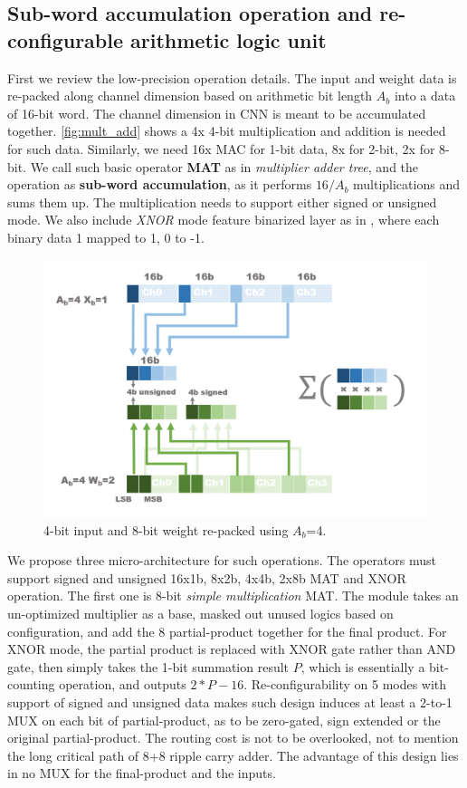 \subsection{Sub-word accumulation operation and re-configurable arithmetic logic unit}
First we review the low-precision operation details. The input and weight data is re-packed along channel dimension based on arithmetic bit length $A_b$ into a data of 16-bit word. The channel dimension in CNN is meant to be accumulated together. \autoref{fig:mult_add} shows a 4x 4-bit multiplication and addition is needed for such data. Similarly, we need 16x MAC for 1-bit data, 8x for 2-bit, 2x for 8-bit. We call such basic operator \textbf{MAT} as in \textit{multiplier adder tree}, and the operation as \textbf{sub-word accumulation}, as it performs $16/A_b$ multiplications and sums them up. The multiplication needs to support either signed or unsigned mode. We also include \textit{XNOR} mode feature binarized layer as in \cite{XnorNet}, where each binary data 1 mapped to 1, 0 to -1. \\
\begin{figure}[h]
    \centering
    \includegraphics[width=1\linewidth]{inc/4_proposed_architecture/figure/mult_add.png}
    \caption{4-bit input and 8-bit weight re-packed using $A_b$=4.}
    \label{fig:mult_add}
\end{figure}
We propose three micro-architecture for such operations. The operators must support signed and unsigned 16x1b, 8x2b, 4x4b, 2x8b MAT and XNOR operation. The first one is 8-bit \textit{simple multiplication} MAT. The module takes an un-optimized multiplier as a base, masked out unused logics based on configuration, and add the 8 partial-product together for the final product. For XNOR mode, the partial product is replaced with XNOR gate rather than AND gate, then simply takes the 1-bit summation result \textbf{$P$}, which is essentially a bit-counting operation, and outputs $2*P-16$. Re-configurability on 5 modes with support of signed and unsigned data makes such design induces at least a 2-to-1 MUX on each bit of partial-product, as to be zero-gated, sign extended or the original partial-product. The routing cost is not to be overlooked, not to mention the long critical path of 8+8 ripple carry adder. The advantage of this design lies in no MUX for the final-product and the inputs. \\
